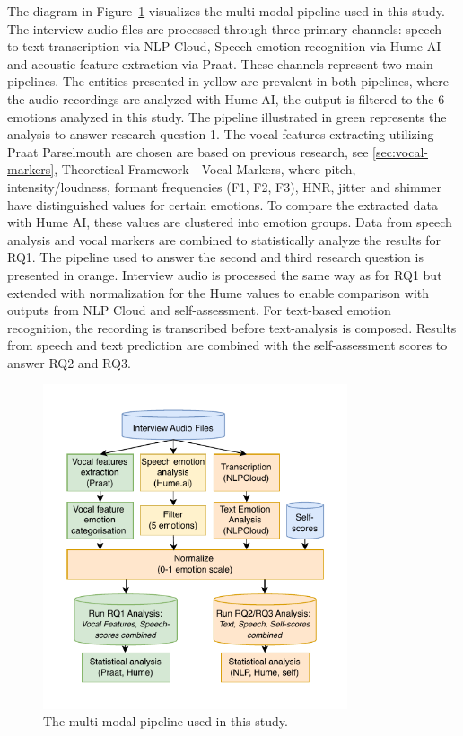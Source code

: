The diagram in Figure~\ref{fig:pipeline} visualizes the multi-modal pipeline used in this study.  
The interview audio files are processed through three primary channels: speech-to-text transcription via NLP Cloud,  
Speech emotion recognition via Hume AI and acoustic feature extraction via Praat.  
These channels represent two main pipelines.  
The entities presented in yellow are prevalent in both pipelines, where the audio recordings are analyzed with Hume AI, the output is filtered to the 6 emotions analyzed in this study.  
The pipeline illustrated in green represents the analysis to answer research question 1.  
The vocal features extracting utilizing Praat Parselmouth are chosen are based on previous research, see \ref{sec:vocal-markers}, Theoretical Framework - Vocal Markers, where pitch, intensity/loudness, formant frequencies (F1, F2, F3), HNR,  
jitter and shimmer have distinguished values for certain emotions.  
To compare the extracted data with Hume AI, these values are clustered into emotion groups.  
Data from speech analysis and vocal markers are combined to statistically analyze the results for RQ1.  
The pipeline used to answer the second and third research question is presented in orange. 
Interview audio is processed the same way as for RQ1 but extended with normalization for the Hume values to enable comparison with outputs from NLP Cloud and self-assessment.  
For text-based emotion recognition, the recording is transcribed before text-analysis is composed. 
Results from speech and text prediction are combined with the self-assessment scores to answer RQ2 and RQ3. 

\begin{figure}[H]
    \centering
    \includegraphics[width=0.8\textwidth]{png/method/flowchart-thesis.pdf}
    \caption{The multi-modal pipeline used in this study.}
    \label{fig:pipeline}
\end{figure}


